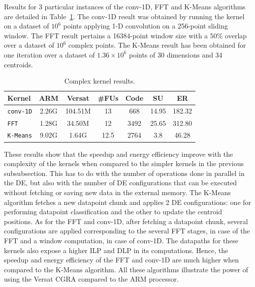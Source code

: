 \documentclass[journal]{IEEEtran}
\begin{document}
Results for 3 particular instances of the conv-1D, FFT and K-Means
algorithms are detailed in Table~\ref{tabExecR2}. The conv-1D result
was obtained by running the kernel on a dataset of $10^6$ points
applying 1-D convolution on a 256-point sliding window. The FFT result
pertains a 16384-point window size with a $50\%$ overlap over a
dataset of $10^6$ complex points. The K-Means result has been obtained
for one iteration over a dataset of $1.36 \times 10^6$ points of 30
dimensions and 34 centroids.

\begin{table}[!h]
  \begin{center}
    \begin{tabular}{lcccccc}
      Kernel & ARM & Versat & \#FUs & Code & SU & ER\\
      \hline
      {\tt conv-1D} & 2.26G & 104.51M & 13   &  668 & 14.95 & 182.32\\
      {\tt FFT}     & 1.28G &  34.50M & 12   & 3492 & 25.65 & 312.80\\
      {\tt K-Means} & 9.02G &   1.64G & 12.5 & 2764 &  3.8  &  46.28\\
      \hline
    \end{tabular}
  \end{center}
  \caption[Table caption shown in TOC]{Complex kernel results.}
  \label{tabExecR2}
\end{table}

These results show that the speedup and energy efficiency improve with
the complexity of the kernels when compared to the simpler kernels in
the previous subsubsection. This has to do with the number of operations
done in parallel in the DE, but also with the number of DE
configurations that can be executed without fetching or saving new
data in the external memory. The K-Means algorithm fetches a new
datapoint chunk and applies 2 DE configurations: one for performing
datapoint classification and the other to update the centroid
positions. As for the FFT and conv-1D, after fetching a datapoint
chunk, several configurations are applied corresponding to the several
FFT stages, in case of the FFT and a window computation, in case of
conv-1D. The datapaths for these kernels also expose a higher ILP and
DLP in its computations. Hence, the speedup and energy efficiency of
the FFT and conv-1D are much higher when compared to the K-Means
algorithm. All these algorithms illustrate the power of using the
Versat CGRA compared to the ARM processor.

\end{document}
